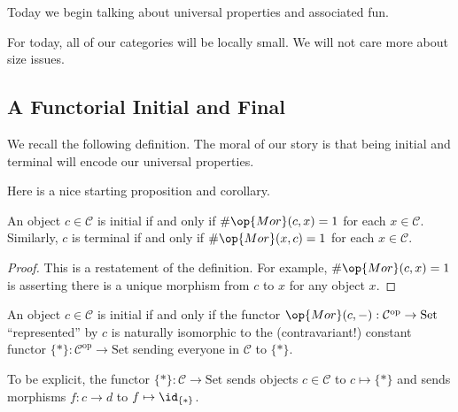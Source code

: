 \documentclass[../notes.tex]{subfiles}
\begin{document}

Today we begin talking about universal properties and associated fun.
\begin{convention}
	For today, all of our categories will be locally small. We will not care more about size issues.
\end{convention}

\subsection{A Functorial Initial and Final}
We recall the following definition.
\initialfinaldefi*
\noindent The moral of our story is that being initial and terminal will encode our universal properties.

Here is a nice starting proposition and corollary.
\begin{proposition}
	An object $c\in\mathcal C$ is initial if and only if $\#\op{Mor}(c,x)=1$ for each $x\in\mathcal C$. Similarly, $c$ is terminal if and only if $\#\op{Mor}(x,c)=1$ for each $x\in\mathcal C$.
\end{proposition}
\begin{proof}
	This is a restatement of the definition. For example, $\#\op{Mor}(c,x)=1$ is asserting there is a unique morphism from $c$ to $x$ for any object $x$.
\end{proof}
\begin{corollary} \label{cor:representinit}
	An object $c\in\mathcal C$ is initial if and only if the functor $\op{Mor}(c,-):\mathcal C^{\mathrm{op}}\to\mathrm{Set}$ ``represented'' by $c$ is naturally isomorphic to the (contravariant!) constant functor $\{*\}:\mathcal C^{\mathrm{op}}\to\mathrm{Set}$ sending everyone in $\mathcal C$ to $\{*\}$.
\end{corollary}
To be explicit, the functor $\{*\}:\mathcal C\to\mathrm{Set}$ sends objects $c\in\mathcal C$ to $c\mapsto\{*\}$ and sends morphisms $f:c\to d$ to $f\mapsto\id_{\{*\}}$.
\end{document}
